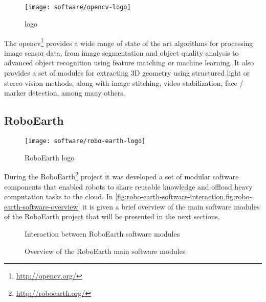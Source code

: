 \subsection{}

\begin{wrapfigure}{r}{0.23\textwidth}
	\centering
	\vspace*{-2em}
	\texttt{[image: software/opencv-logo]}
	\caption{ logo}
	\label{fig:opencv-logo}
\end{wrapfigure}

The \gls{opencv}\footnote{\url{http://opencv.org/}} provides a wide range of state of the art algorithms for processing image sensor data, from image segmentation and object quality analysis to advanced object recognition using feature matching or machine learning. It also provides a set of modules for extracting 3D geometry using structured light or stereo vision methods, along with image stitching, video stabilization, face / marker detection, among many others.


\subsection{RoboEarth}

\begin{wrapfigure}{r}{0.23\textwidth}
	\centering
	\vspace*{-2em}
	\texttt{[image: software/robo-earth-logo]}
	\caption{RoboEarth logo}
	\label{fig:robo-earth-logo}
\end{wrapfigure}

During the RoboEarth\footnote{\url{http://roboearth.org/}} project it was developed a set of modular software components that enabled robots to share reusable knowledge and offload heavy computation tasks to the cloud. In \cref{fig:robo-earth-software-interaction,fig:robo-earth-software-overview} it is given a brief overview of the main software modules of the RoboEarth project that will be presented in the next sections.


\begin{figure}[H]
	\begin{floatrow}[2]
		{\caption[Interaction between RoboEarth software modules]{Interaction between RoboEarth software modules \cite{DiMarco2013}}\label{fig:robo-earth-software-interaction}}

		{\caption[Overview of the RoboEarth main software modules]{Overview of the RoboEarth main software modules\protect\footnotemark}\label{fig:robo-earth-software-overview}}
	\end{floatrow}
\end{figure}





